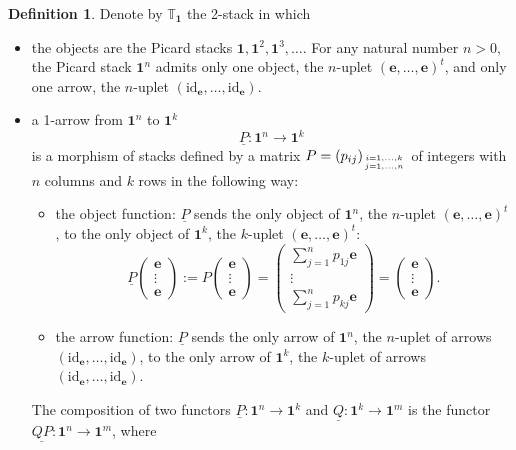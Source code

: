\documentclass[11pt]{amsart}
\newcommand{\id}{\mathrm{id}}
\newcommand{\bfu}{\textbf{1}}
\newcommand{\twoT}{\mathbb{T}}
\theoremstyle{definition}
\newtheorem{definition}[theorem]{Definition}
\numberwithin{equation}{section}
\begin{document}
\begin{definition}
 Denote by $\twoT_{\bfu}$ the 2-stack in which 
\begin{itemize}
	\item the objects are the Picard stacks $\bfu, \bfu^2, \bfu^3,\dots$. For any natural number $n>0,$ the Picard stack $\bfu^n$ admits only one object, the $n$-uplet $(\mathbf{e}, \dots, \mathbf{e})^t$, and only one arrow, the $n$-uplet $(\id_\mathbf{e}, \dots, \id_\mathbf{e})$.
	\item a 1-arrow from $\bfu^n$ to $\bfu^k$
	$$\underline{P}: \bfu^n \to \bfu^k$$
	  is a morphism of stacks defined by a matrix $P=(p_{ij})_{i=1, \dots,k \atop j=1, \dots ,n}$ of integers with $n$ columns and $k$ rows in the following way:
	  \begin{itemize}
	  	\item the object function: $\underline{P}$ sends the only object of $\bfu^n$, the $n$-uplet $(\mathbf{e}, \dots, \mathbf{e})^t$, to the only object of  $\bfu^k$, the $k$-uplet $(\mathbf{e}, \dots, \mathbf{e})^t$:
	  	$$\underline{P} \left(\begin{matrix} \mathbf{e} \\ \vdots \\ \mathbf{e}\end{matrix} \right) := P \left(\begin{matrix} \mathbf{e} \\ \vdots \\ \mathbf{e}\end{matrix}\right)
	  	=  \left(\begin{matrix} \sum_{j=1}^np_{1j}\mathbf{e} \\ \vdots \\ \sum_{j=1}^np_{kj}\mathbf{e}\end{matrix}\right)
	  	=  \left(\begin{matrix} \mathbf{e} \\ \vdots \\ \mathbf{e}\end{matrix}\right).$$
	  	\item  the arrow function: $\underline{P}$ sends the only arrow of $\bfu^n$, the $n$-uplet of arrows $(\id_\mathbf{e}, \dots, \id_\mathbf{e})$, to the only arrow of $\bfu^k$, the $k$-uplet of arrows $(\id_\mathbf{e}, \dots, \id_\mathbf{e})$. 
	  \end{itemize}
	The composition of two functors $\underline{P}: \bfu^n \to \bfu^k$ and $\underline{Q}: \bfu^k \to \bfu^m$ is the functor $\underline{QP}: \bfu^n \to \bfu^m$, where 

\end{itemize}
\end{definition}
\end{document}
